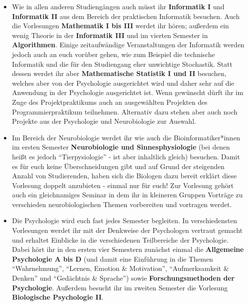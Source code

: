 \begin{itemize}

\item Wie in allen anderen Studiengängen auch müsst ihr \textbf{Informatik I}
    und \textbf{Informatik II} aus dem Bereich der praktischen Informatik
    besuchen. Auch die Vorlesungen \textbf{Mathematik I bis III} werdet ihr
    h\"oren; au\ss{}erdem ein wenig Theorie in der \textbf{Informatik III}
    und im vierten Semester in \textbf{Algorithmen}. Einige zeitaufwändige
    Veranstaltungen der Informatik werden jedoch auch an euch vorüber gehen, wie
    zum Beispiel die technische Informatik und die für den Studiengang eher
    unwichtige Stochastik. Statt dessen werdet ihr aber \textbf{Mathematische 
    Statistik I und II} besuchen, welches aber von der Psychologie ausgerichtet 
    wird und daher sehr auf die Anwendung in der Psychologie ausgerichtet 
    ist. Wenn gewünscht dürft ihr im Zuge des Projektpraktikums auch an 
    ausgewählten Projekten des Programmierpraktikum teilnehmen. Alternativ dazu 
    stehen aber auch noch Projekte aus der Psychologie und Neurobiologie zur 
    Auswahl.

\item Im Bereich der Neurobiologie werdet ihr wie auch die Bioinformatiker*innen im 
ersten Semester \textbf{Neurobiologie und Sinnesphysiologie} (bei denen heißt 
es jedoch "`Tierpysiologie"' - ist aber inhaltlich gleich) besuchen. Damit es 
für euch keine Überschneidungen gibt und auf Grund der steigenden Anzahl von 
Studierenden, haben sich die Biologen dazu bereit erklärt diese Vorlesung doppelt 
anzubieten - einmal nur für euch! Zur Vorlesung gehört auch ein gleichnamiges 
Seminar in dem ihr in kleineren Gruppen Vorträge zu verschieden 
neurobiologischen Themen vorbereiten und vortragen werdet.

\item Die Psychologie wird euch fast jedes Semester begleiten. In 
verschiedensten Vorlesungen werdet ihr mit der Denkweise der Psychologen 
vertraut gemacht und erhaltet Einblicke in die verschiedenen Teilbereiche der 
Psychologie. Dabei h\"ort ihr in den ersten vier Semestern zunächst einmal 
die \textbf{Allgemeine Psychologie A bis D} (und damit eine Einf\"uhrung in die 
Themen "`Wahrnehmung"', "`Lernen, Emotion \& Motivation"', "`Aufmerksamkeit \& 
Denken"' und "`Gedächtnis \& Sprache"') sowie \textbf{Forschungsmethoden der 
Psychologie}. Au\ss{}erdem besucht ihr im zweiten Semester die Vorlesung 
\textbf{Biologische Psychologie II}.


\end{itemize}
